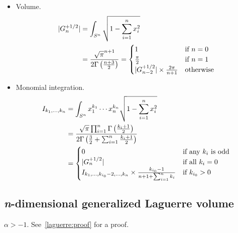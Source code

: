 \documentclass[draft]{scrartcl}
\begin{document}
\begin{itemize}
  \item Volume.
    \begin{align}\nonumber
    |G_n^{+1/2}|
      &= \int_{S^n} \sqrt{1 - \sum_{i=1}^n x_i^2}\\
      &= \frac{%
        \sqrt{\pi}^{n+1}
      }{%
        2\Gamma\left(\frac{n+3}{2}\right)
      }
      = \begin{cases}
        1&\text{if $n=0$}\\
        \frac{\pi}{2}&\text{if $n=1$}\\
        |G_{n-2}^{+1/2}| \times \frac{2\pi}{n+1}&\text{otherwise}
      \end{cases}
    \end{align}

  \item Monomial integration.
    \begin{align}\nonumber
    I_{k_1,\dots,k_n}
      &= \int_{S^n} x_1^{k_1}\cdots x_n^{k_n} \sqrt{1 - \sum_{i=1}^n
      x_i^2}\\
      &= \frac{%
        \sqrt{\pi}\prod_{i=1}^n \Gamma\left(\frac{k_i+1}{2}\right)
      }{%
        2\Gamma\left(\frac{3}{2} + \sum_{i=1}^n \frac{k_i+1}{2}\right)
      }\\
      &= \begin{cases}
        0&\text{if any $k_i$ is odd}\\
        |G_n^{+1/2}|&\text{if all $k_i=0$}\\
        I_{k_1,\dots,k_{i_0}-2,\dots,k_n} \times \frac{k_{i_0}-1}{n + 1 + \sum_{i=1}^n k_i}&\text{if $k_{i_0} > 0$}
      \end{cases}
    \end{align}
\end{itemize}


\subsection*{\textit{n}-dimensional generalized Laguerre volume}

$\alpha > -1$. See~\ref{laguerre:proof} for a proof.
\end{document}
